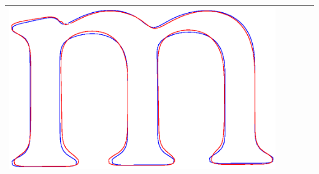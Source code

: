 \documentclass[12pt]{article}
\begin{document}
\begin{center}
\begin{tabular}{|c|c|c|c|c|}
\includegraphics[scale = 0.2]{images/f3var0_01} \\ \hline
\end{tabular}
\end{center}
\end{document}

